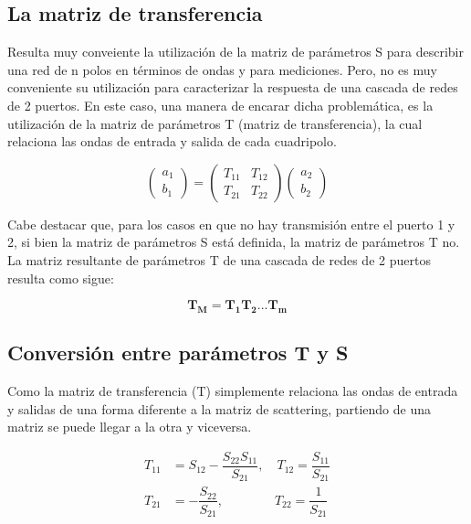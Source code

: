\subsection{La matriz de transferencia}

Resulta muy conveiente la utilización de la matriz de parámetros S para describir una red de n polos en términos de ondas y 
para mediciones. Pero, no es muy conveniente su utilización para caracterizar la respuesta de una cascada de redes de 2 
puertos. En este caso, una manera de encarar dicha problemática, es la utilización de la matriz de parámetros T (matriz 
de transferencia), la cual relaciona las ondas de entrada y salida de cada cuadripolo.

\begin{equation}
\begin{pmatrix} a_1\\b_1 \end{pmatrix} = \begin{pmatrix} T_{11} & T_{12}\\T_{21} & T_{22} \end{pmatrix} 
\begin{pmatrix} a_2\\b_2 \end{pmatrix}
\end{equation}

Cabe destacar que, para los casos en que no hay transmisión entre el puerto 1 y 2, si bien la matriz de parámetros S está definida, 
la matriz de parámetros T no. La matriz resultante de parámetros T de una cascada de redes de 2 puertos resulta como sigue:

\begin{equation}
\mathbf{T_M=T_1T_2...T_m}
\end{equation}

\subsection{Conversión entre parámetros T y S}

Como la matriz de transferencia (T) simplemente relaciona las ondas de entrada y salidas de una forma diferente a la matriz de 
scattering, partiendo de una matriz se puede llegar a la otra y viceversa.

\begin{equation}
	\begin{aligned}
		T_{11} &= S_{12} - \dfrac{S_{22}S_{11}}{S_{21}},\quad T_{12} = \dfrac{S_{11}}{S_{21}} \\
		T_{21} &= - \dfrac{S_{22}}{S_{21}},\qquad\qquad T_{22} = \dfrac{1}{S_{21}}
	\end{aligned}
\end{equation}

